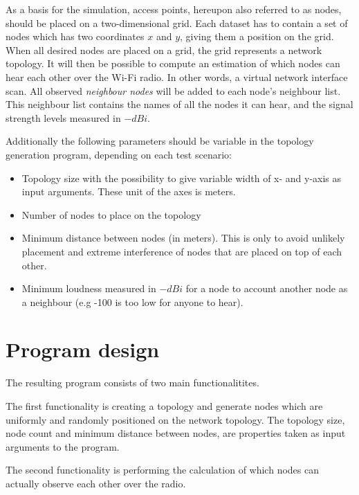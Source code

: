As a basis for the simulation, access points, hereupon also referred to as nodes, should be placed on a two-dimensional grid. Each dataset has to contain a set of nodes which has two coordinates $x$ and $y$, giving them a position on the grid. When all desired nodes are placed on a grid, the grid represents a network topology. It will then be possible to compute an
estimation of which nodes can hear each other over the Wi-Fi radio. In other words, a virtual network interface scan. All observed \textit{neighbour nodes} will be added to each node's
neighbour list. This neighbour list contains the names of all the nodes it can hear, and the signal strength levels measured in $-dBi$.

Additionally the following parameters should be variable in the topology generation program, depending on each test scenario:

\begin{itemize}
	\item Topology size with the possibility to give variable width of x- and y-axis as input arguments. These unit of the axes is meters. 
	\item Number of nodes to place on the topology
	\item Minimum distance between nodes (in meters). This is only to avoid unlikely placement and extreme interference of nodes that are placed on top of each other. 
	\item Minimum loudness measured in $-dBi$ for a node to account another node as a neighbour (e.g -100 is too low for anyone to hear).
\end{itemize}


	\section{Program design}\label{prog_design}
	The resulting program consists of two main functionalitites.

	The first functionality is creating a topology and generate nodes which are uniformly
	and randomly positioned on the network topology. The topology size, node count and minimum distance
	between nodes, are properties taken as input arguments to the program.

	The second functionality is performing the calculation of which nodes can actually observe each other over the radio.
	
